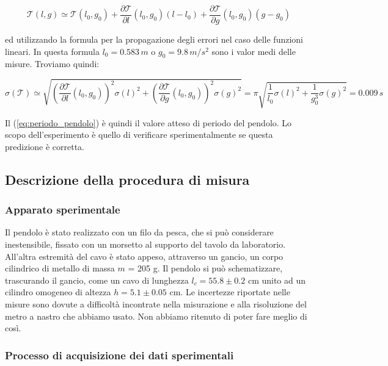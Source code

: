 \begin{equation*}
    \mathcal{T}(l, g) \simeq \mathcal{T}(l_0, g_0) + \frac{\partial\mathcal{T}}{\partial{l}}(l_0, g_0)(l - l_0)
    + \frac{\partial\mathcal{T}}{\partial{g}}(l_0, g_0)(g - g_0)
\end{equation*}

ed utilizzando la formula per la propagazione degli errori nel caso delle funzioni lineari.
In questa formula $l_0 = 0.583 \, m$ o $g_0 = 9.8 \, m/s^2$ sono i valor medi delle misure.
Troviamo quindi:

\begin{equation*}
    \sigma(\mathcal{T}) \simeq \sqrt{(\frac{\partial\mathcal{T}}{\partial{l}}(l_0, g_0))^2\sigma(l)^2
    + (\frac{\partial\mathcal{T}}{\partial{g}}(l_0, g_0))^2\sigma(g)^2} =
    \pi\sqrt{\frac{1}{l_0}\sigma(l)^2 + \frac{1}{g_0^3}\sigma(g)^2} = 0.009 \, s
\end{equation*}

Il (\ref{eq:periodo_pendolo}) è quindi il valore atteso di periodo del pendolo.
Lo scopo dell'esperimento è quello di verificare sperimentalmente se questa predizione
è corretta.

\subsection{Descrizione della procedura di misura}

\subsubsection{Apparato sperimentale}

Il pendolo è stato realizzato con un filo da pesca, che si può considerare
inestensibile, fissato con un morsetto al supporto del tavolo da laboratorio.
All'altra estremità del cavo è stato appeso, attraverso un gancio, un corpo
cilindrico di metallo di massa $m$ = 205 g. Il pendolo si può schematizzare,
trascurando il gancio, come un cavo di lunghezza $l_c = 55.8 \pm 0.2$ 
cm unito ad un cilindro omogeneo di altezza $h = 5.1 \pm 0.05$ cm.
Le incertezze riportate nelle misure sono dovute a difficoltà incontrate nella
misurazione e alla risoluzione del metro a nastro che abbiamo usato.
Non abbiamo ritenuto di poter fare meglio di così.

\subsubsection{Processo di acquisizione dei dati sperimentali}

